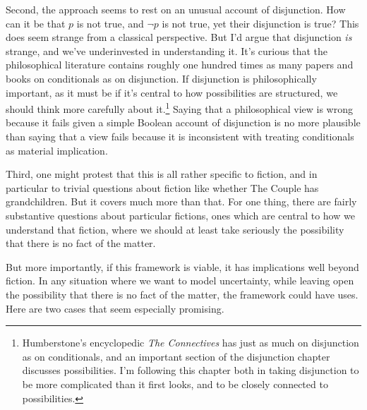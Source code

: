 \documentclass[
  11pt,
  letterpaper,
  DIV=11,
  numbers=noendperiod,
  twoside]{scrartcl}
\begin{document}
Second, the approach seems to rest on an unusual account of disjunction.
How can it be that \(p\) is not true, and \(\neg p\) is not true, yet
their disjunction is true? This does seem strange from a classical
perspective. But I'd argue that disjunction \emph{is} strange, and we've
underinvested in understanding it. It's curious that the philosophical
literature contains roughly one hundred times as many papers and books
on conditionals as on disjunction. If disjunction is philosophically
important, as it must be if it's central to how possibilities are
structured, we should think more carefully about it.\footnote{Humberstone's
  encyclopedic \emph{The Connectives} has just as much on disjunction as
  on conditionals, and an important section of the disjunction chapter
  discusses possibilities. I'm following this chapter both in taking
  disjunction to be more complicated than it first looks, and to be
  closely connected to possibilities.} Saying that a philosophical view
is wrong because it fails given a simple Boolean account of disjunction
is no more plausible than saying that a view fails because it is
inconsistent with treating conditionals as material implication.

Third, one might protest that this is all rather specific to fiction,
and in particular to trivial questions about fiction like whether The
Couple has grandchildren. But it covers much more than that. For one
thing, there are fairly substantive questions about particular fictions,
ones which are central to how we understand that fiction, where we
should at least take seriously the possibility that there is no fact of
the matter.

But more importantly, if this framework is viable, it has implications
well beyond fiction. In any situation where we want to model
uncertainty, while leaving open the possibility that there is no fact of
the matter, the framework could have uses. Here are two cases that seem
especially promising.
\end{document}
